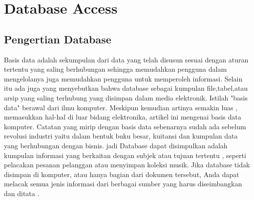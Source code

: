 
\section{Database Access}

\subsection{Pengertian Database}
	Basis data adalah sekumpulan dari data yang telah disusun sesuai dengan aturan tertentu yang saling berhubungan sehingga memudahkan pengguna dalam mengelolanya juga memudahkan pengguna untuk memperoleh informasi. Selain itu ada juga yang menyebutkan bahwa database sebagai kumpulan ﬁle,tabel,atau arsip yang saling terhubung yang disimpan dalam media elektronik.
	Istilah "basis data" berawal dari ilmu komputer. Meskipun kemudian artinya semakin luas , memasukkan hal-hal di luar bidang elektronika, artikel ini mengenai basis data komputer. Catatan yang mirip dengan basis data sebenarnya sudah ada sebelum revolusi industri yaitu dalam bentuk buku besar, kuitansi dan kumpulan data yang berhubungan dengan bisnis.
	jadi Database dapat disimpulkan adalah kumpulan informasi yang berkaitan dengan subjek atau tujuan tertentu , seperti pelacakan pesanan pelanggan atau menyimpan koleksi musik. Jika database tidak disimpan di komputer, atau hanya bagian dari dokumen tersebut, Anda dapat melacak semua jenis informasi dari berbagai sumber yang harus diseimbangkan dan ditata .

